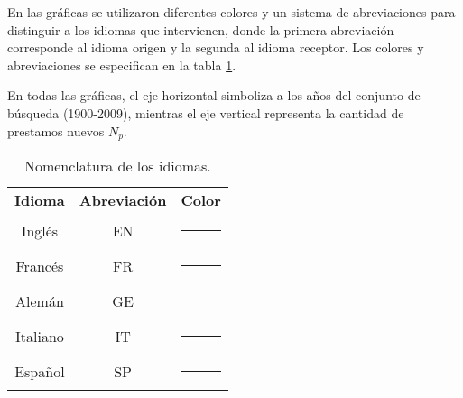 

En las gráficas se utilizaron diferentes colores y un sistema de abreviaciones para distinguir a los idiomas que intervienen, donde la primera abreviación corresponde al idioma origen y la segunda al idioma receptor. Los colores y abreviaciones se especifican  en la tabla \ref{tab.idcolor}. 

En todas las gráficas, el eje horizontal simboliza a los años del conjunto de búsqueda (1900-2009),  mientras el eje vertical representa la cantidad de prestamos nuevos $N_{p}$. 

\begin{table} %
	\centering
	\begin{tabular}{ccc}
		\textbf{Idioma} & \textbf{Abreviación} & \textbf{Color} \\
		Inglés          & EN                   & \textcolor{C1-EN}{\rule{0.25cm}{0.25cm}}           \\
		Francés         & FR                   & \textcolor{C1-FR}{\rule{0.25cm}{0.25cm}}      \\
		Alemán          & GE                   & \textcolor{C1-GE}{\rule{0.25cm}{0.25cm}}       \\
		Italiano        & IT                   & \textcolor{C1-IT}{\rule{0.25cm}{0.25cm}}          \\
		Español         & SP                   & \textcolor{C1-SP}{\rule{0.25cm}{0.25cm}}        
	\end{tabular}
	\caption{Nomenclatura de los idiomas.}
	\label{tab.idcolor}
\end{table} %




	




